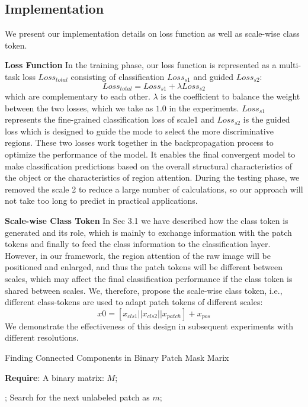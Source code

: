 \documentclass[sigconf]{acmart}
\begin{document}
\subsection{Implementation}
We present our implementation details on loss function as well as scale-wise class token.

    \textbf{Loss Function} In the training phase, our loss function is represented as a multi-task loss $Loss_{total}$ consisting of classification $Loss_{s1}$ and guided $Loss_{s2}$:
\begin{equation}
    Loss_{total} = Loss_{s1} + \lambda Loss_{s2}
\end{equation}
which are complementary to each other. $\lambda$ is the coefficient to balance the weight between the two losses, which we take as $1.0$ in the experiments. $Loss_{s1}$ represents the fine-grained classification loss of scale1 and $Loss_{s2}$ is the guided loss which is designed to guide the mode to select the more discriminative regions. These two losses work together in the backpropagation process to optimize the performance of the model. It enables the final convergent model to make classification predictions based on the overall structural characteristics of the object or the characteristics of region attention. During the testing phase, we removed the scale 2 to reduce a large number of calculations, so our approach will not take too long to predict in practical applications. 

\textbf{Scale-wise Class Token} In Sec 3.1 we have described how the class token is generated and its role, which is mainly to exchange information with the patch tokens and finally to feed the class information to the classification layer. However, in our framework, the region attention of the raw image will be positioned and enlarged, and thus the patch tokens will be different between scales, which may affect the final classification performance if the class token is shared between scales. We, therefore, propose the scale-wise class token, i.e., different class-tokens are used to adapt patch tokens of different scales:
\begin{equation}
    x0 = [x_{cls1}||x_{cls2}||x_{patch}] + x_{pos}
\end{equation}
We demonstrate the effectiveness of this design in subsequent experiments with different resolutions.

\begin{algorithm}[tb]
\caption{Finding Connected Components in Binary Patch Mask Marix}
\label{alg:algorithm}
\textbf{Require}: A binary matrix: $M$;
\begin{algorithmic}[1] 
    ;
    \ENDIF
\STATE Search for the next unlabeled patch as $m$;
\ENDWHILE
{}
\end{algorithmic}
\end{algorithm}
\end{document}
